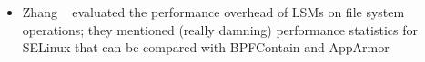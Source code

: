 \begin{inprogress}
  \begin{itemize}
    \item Zhang \etal~\cite{zhang2021_lsm_file_overhead} evaluated the performance
    overhead of LSMs on file system operations; they mentioned (really damning) performance
    statistics for SELinux that can be compared with BPFContain and AppArmor
  \end{itemize}
\end{inprogress}
